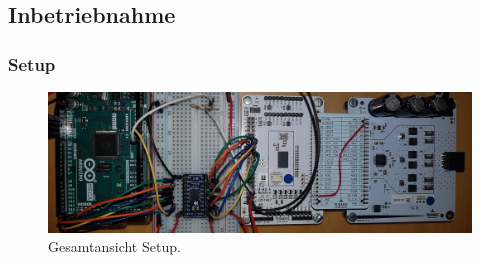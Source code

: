 \subsection{Inbetriebnahme}

\subsubsection{Setup}\label{Appendix:TMC4671_Setup}

\begin{figure}[H]
	\centering
	\includegraphics[angle=270,width=\textwidth]{graphics/2_komplett1}
	\caption{Gesamtansicht Setup.}
	\label{fig:2_komplett1}
\end{figure}

